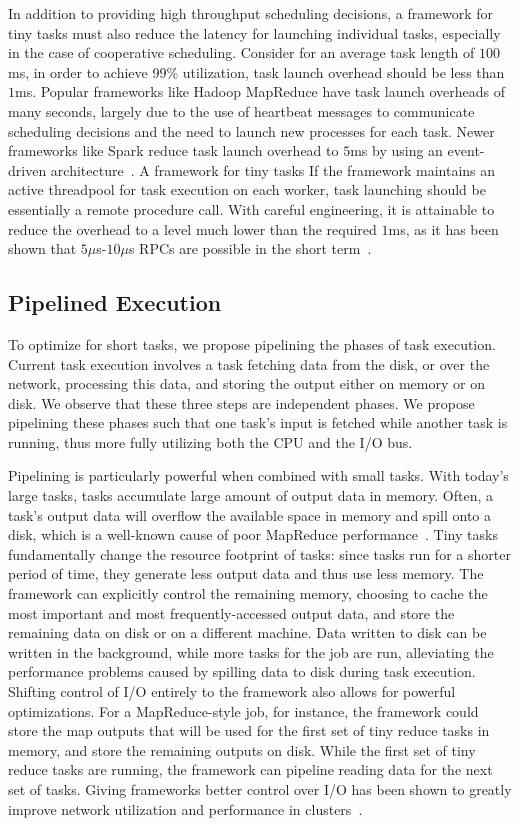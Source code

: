 In addition to providing high throughput scheduling decisions, a framework for
tiny tasks must also reduce the latency for launching individual tasks,
especially in the case of cooperative scheduling.
Consider for an average task length of $100$ms, in order to achieve 99\% utilization,
task launch overhead should be less than $1$ms.
Popular frameworks like Hadoop MapReduce
have task launch overheads of many seconds, largely due to the use of
heartbeat messages to communicate scheduling decisions and the need to launch new
processes for each task.
Newer frameworks like Spark reduce task launch overhead to $5$ms
by using an event-driven architecture~\cite{shark-tr}.
A framework for tiny tasks 
If the framework maintains an active threadpool for task execution on each worker,
task launching should be essentially a remote procedure call.
With careful engineering,
it is attainable to reduce the overhead to a level much lower than the
required $1$ms, as it has been shown that $5\mu$s-$10\mu$s RPCs are possible
in the short term~\cite{low-latency}.

\subsection{Pipelined Execution}
\label{sec:pipeline}
To optimize for short tasks, we propose pipelining the phases of task execution.
Current task execution involves a task fetching data from the disk, or over the network,
processing this data, and storing the output either on memory or on disk. We observe
that these three steps are independent phases. We propose pipelining these phases such that one task's
input is fetched while another task is running, thus more fully utilizing both
the CPU and the I/O bus.

Pipelining is particularly powerful when combined with small tasks. With
today's large tasks, tasks accumulate large amount of output data in memory.
Often, a task's output data will overflow the available space in memory
and spill onto a disk, which is a well-known cause of poor MapReduce
performance~\cite{lipcon2012optimizing}. Tiny tasks fundamentally change the
resource footprint of tasks: since tasks run for a shorter period of time,
they generate less output data and thus use less memory. The framework can
explicitly control the remaining memory, choosing to cache the most important
and most frequently-accessed output data, and store the remaining data on disk
or on a different machine. Data written to disk can be written in the
background, while more tasks for the job are run, alleviating the performance
problems caused by spilling data to disk during task execution.
Shifting control of I/O entirely to the framework also allows for
powerful optimizations.  For a MapReduce-style job, for instance, the
framework could store the map outputs that will be used for the first set of
tiny reduce tasks in memory, and store the remaining outputs on disk. While
the first set of tiny reduce tasks are running, the framework can pipeline
reading data for the next set of tasks.  Giving frameworks better control over
I/O has been shown
to greatly improve network utilization and performance in
clusters~\cite{chowdhury2011managing, chowdhury2012coflow}.


